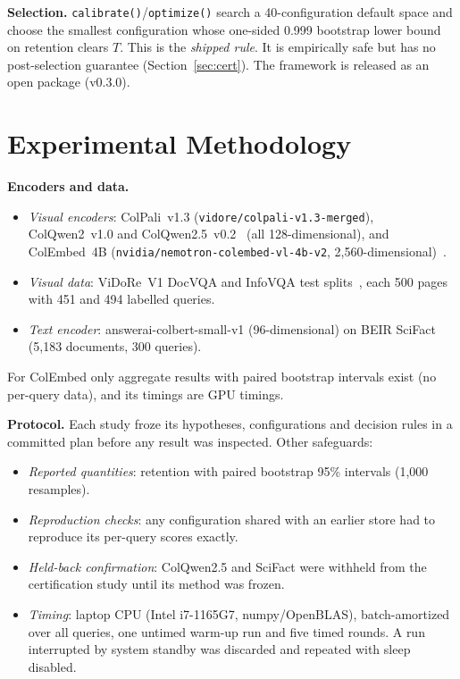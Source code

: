 \documentclass[conference]{IEEEtran}
\begin{document}
\textbf{Selection.} \texttt{calibrate()}/\texttt{optimize()} search a 40-configuration
default space and choose the smallest configuration whose one-sided 0.999 bootstrap
lower bound on retention clears $T$. This is the \emph{shipped rule}. It is empirically
safe but has no post-selection guarantee (Section~\ref{sec:cert}). The framework is
released as an open package (v0.3.0).

\section{Experimental Methodology}
\label{sec:method}

\textbf{Encoders and data.}
\begin{itemize}
\item \emph{Visual encoders}: ColPali~v1.3 (\texttt{vidore/colpali-v1.3-merged}),
ColQwen2~v1.0 and ColQwen2.5~v0.2~\cite{colpali} (all 128-dimensional), and ColEmbed~4B
(\texttt{nvidia/nemotron-colembed-vl-4b-v2}, 2,560-dimensional)~\cite{colembed}.
\item \emph{Visual data}: ViDoRe~V1 DocVQA and InfoVQA test splits~\cite{colpali}, each
500 pages with 451 and 494 labelled queries.
\item \emph{Text encoder}: answerai-colbert-small-v1 (96-dimensional) on BEIR
SciFact~\cite{beir} (5,183 documents, 300 queries).
\end{itemize}
For ColEmbed only aggregate results with paired bootstrap intervals exist (no per-query
data), and its timings are GPU timings.

\textbf{Protocol.} Each study froze its hypotheses, configurations and decision rules in
a committed plan before any result was inspected. Other safeguards:
\begin{itemize}
\item \emph{Reported quantities}: retention with paired bootstrap 95\% intervals
(1,000 resamples).
\item \emph{Reproduction checks}: any configuration shared with an earlier store had to
reproduce its per-query scores exactly.
\item \emph{Held-back confirmation}: ColQwen2.5 and SciFact were withheld from the
certification study until its method was frozen.
\item \emph{Timing}: laptop CPU (Intel i7-1165G7, numpy/OpenBLAS), batch-amortized over
all queries, one untimed warm-up run and five timed rounds. A run interrupted by system
standby was discarded and repeated with sleep disabled.
\end{itemize}
\end{document}
